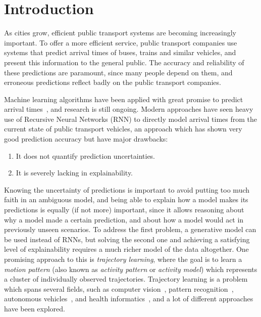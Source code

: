\chapter{Introduction}
\label{cha:introduction}
As cities grow, efficient public transport systems
are becoming increasingly important. To offer a more efficient
service, public transport companies use systems
that predict arrival times of buses, trains and similar vehicles,
and present this information to the general public. The accuracy
and reliability of these predictions are paramount, since many 
people depend on them, and erroneous predictions reflect badly on the
public transport companies.

Machine learning algorithms have been applied with great
promise to predict arrival times~\cite{kim2017probabilistic, 
  pang2018learning, Nguyen2018Jun}, and research is still ongoing.
Modern approaches have seen heavy use of Recursive Neural Networks
(RNN) to
directly model arrival times from the current state of public
transport vehicles, an approach which has shown very good prediction accuracy
but have major drawbacks:

\begin{enumerate}
\item It does not quantify prediction uncertainties.
\item It is severely lacking in explainability.
\end{enumerate}

Knowing the uncertainty of predictions is important to avoid putting
too much faith in an ambiguous model, and being able to explain how
a model makes its predictions is equally (if not more) important,
since it allows reasoning about why a model made a certain prediction,
and about how a model would act in previously unseen scenarios. 
To address the first problem, a generative model can be used instead
of RNNs, but solving the second one and achieving a satisfying
level of explainability requires a much richer model of the data altogether.
One promising approach to this is \textit{trajectory learning}, where the goal
is to learn a \textit{motion pattern} (also known as \textit{activity
  pattern} or \textit{activity model})
which represents a cluster of individually observed
trajectories. Trajectory learning is a problem which spans several
fields, such as computer vision~\cite{Morris2008Sep, Zhang2006Aug,
  Kim2011Nov, Campo2017Aug}, pattern recognition~\cite{Tang2018Aug}, autonomous 
vehicles~\cite{Goli2018Jun}, and health informatics~\cite{Pimentel2013Sep},
and a lot of different approaches have been explored.

